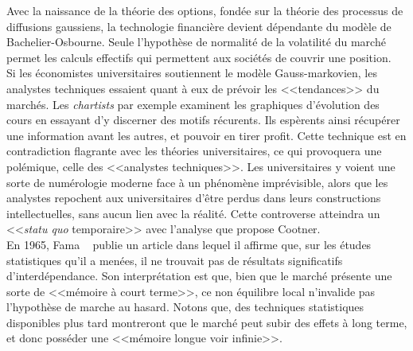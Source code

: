 \documentclass{article}
\begin{document}
Avec la naissance de la théorie des options, fondée sur la théorie des processus de diffusions gaussiens, la technologie financière devient dépendante du modèle de Bachelier-Osbourne. Seule l'hypothèse de normalité de la volatilité du marché permet les calculs effectifs qui permettent aux sociétés de couvrir une position.\\

Si les économistes universitaires soutiennent le modèle Gauss-markovien, les analystes techniques essaient quant à eux de prévoir les <<tendances>> du marchés. Les \textit{chartists} par exemple examinent les graphiques d'évolution des cours en essayant d'y discerner des motifs récurents. Ils espèrents ainsi récupérer une information avant les autres, et pouvoir en tirer profit. Cette technique est en contradiction flagrante avec les théories universitaires, ce qui provoquera une polémique, celle des <<analystes techniques>>. Les universitaires y voient une sorte de numérologie moderne face à un phénomène imprévisible, alors que les analystes repochent aux universitaires d'être perdus dans leurs constructions intellectuelles, sans aucun lien avec la réalité. Cette controverse atteindra un <<\textit{statu quo} temporaire>> avec l'analyse que propose Cootner. \\

En 1965, Fama ~\cite{Fama} publie un article dans lequel il affirme que, sur les études statistiques qu'il a menées, il ne trouvait pas de résultats significatifs d'interdépendance. Son interprétation est que, bien que le marché présente une sorte de <<mémoire à court terme>>, ce non équilibre local n'invalide pas l'hypothèse de marche au hasard. Notons que, des techniques statistiques disponibles plus tard montreront que le marché peut subir des effets à long terme, et donc posséder une <<mémoire longue voir infinie>>.\\
\end{document}
